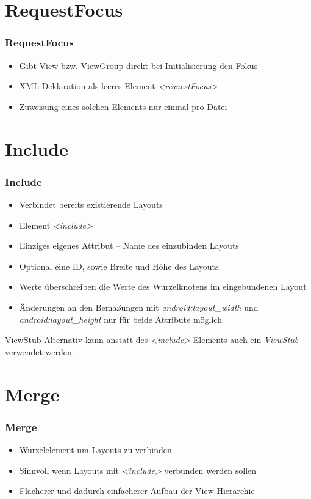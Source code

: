\section{RequestFocus}
\begin{frame}
   \frametitle{RequestFocus}
   \begin{itemize}
      \item Gibt View bzw. ViewGroup direkt bei Initialisierung den Fokus
      \item XML-Deklaration als leeres Element \emph{\textless{}requestFocus\textgreater}
      \item Zuweisung eines solchen Elements nur einmal pro Datei
   \end{itemize}
\end{frame}

\section{Include}
\begin{frame}
   \frametitle{Include}
   \begin{itemize}
      \item Verbindet bereits existierende Layouts
      \item Element \emph{\textless{}include\textgreater}
      \item Einziges eigenes Attribut -- Name des einzubinden Layouts
      \item Optional eine ID, sowie Breite und Höhe des Layouts
      \item Werte überschreiben die Werte des Wurzelknotens im eingebundenen Layout
      \item Änderungen an den Bemaßungen mit \emph{android:layout\_width} und 
      	\emph{android:layout\_height} nur für beide Attribute möglich
   \end{itemize}

   \begin{alertblock}{ViewStub}
      Alternativ kann anstatt des \emph{\textless{}include\textgreater}-Elements 
      auch ein \emph{ViewStub} verwendet werden.
   \end{alertblock}
\end{frame}

\section{Merge}
\begin{frame}
   \frametitle{Merge}
   \begin{itemize}
      \item Wurzelelement um Layouts zu verbinden
      \item Sinnvoll wenn Layouts mit \emph{\textless{}include\textgreater} 
         verbunden werden sollen
      \item Flacherer und dadurch einfacherer Aufbau der View-Hierarchie
   \end{itemize}
\end{frame}


